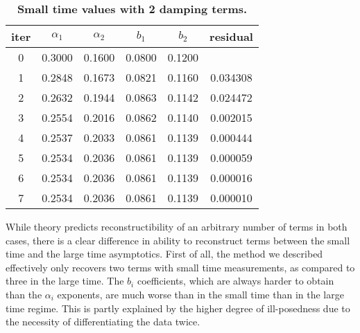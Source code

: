 \begin{table}[H]
\centering
\small
\footnotesize
\begin{tabular}{|c|c|c|c|c|c|}
\hline
iter & $\alpha_1$ & $\alpha_2$ & $b_1$ & $b_2$ & residual\\
\hline
0 & 0.3000 & 0.1600 & 0.0800 & 0.1200 &  \\
1 & 0.2848 & 0.1673 & 0.0821 & 0.1160 & 0.034308 \\
2 & 0.2632 & 0.1944 & 0.0863 & 0.1142 & 0.024472 \\
3 & 0.2554 & 0.2016 & 0.0862 & 0.1140 & 0.002015 \\
4 & 0.2537 & 0.2033 & 0.0861 & 0.1139 & 0.000444 \\
5 & 0.2534 & 0.2036 & 0.0861 & 0.1139 & 0.000059 \\
6 & 0.2534 & 0.2036 & 0.0861 & 0.1139 & 0.000016 \\
7 & 0.2534 & 0.2036 & 0.0861 & 0.1139 & 0.000010 \\
\hline
\end{tabular}
\small
	\caption{{\small\bf Small time values with 2 damping terms.}
\label{tab:smalltime}}
\end{table}

While theory predicts reconstructibility of an arbitrary number of terms in both cases,
there is a clear difference in ability to reconstruct terms between the small time and the large time asymptotics. 
First of all, the method we described effectively only recovers two terms with small time measurements, as compared to three in the large time. 
The $b_i$ coefficients, which are always harder to obtain than the $\alpha_i$ exponents, are much worse than in the small time than in the large time regime.
This is partly explained by the higher degree of ill-posedness due to the necessity of differentiating the data twice. 



